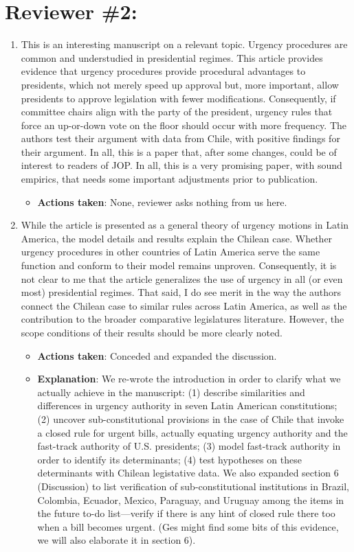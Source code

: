 \documentclass[article,letterpaper,times,12pt,listings-bw,microtype]{article}
\begin{document}
\section{Reviewer \#2:}
\label{sec:orga4b521d}
\begin{enumerate}
\item This is an interesting manuscript on a relevant topic. Urgency procedures are common and understudied in presidential regimes. This article provides evidence that urgency procedures provide procedural advantages to presidents, which not merely speed up approval but, more important, allow presidents to approve legislation with fewer modifications. Consequently, if committee chairs align with the party of the president, urgency rules that force an up-or-down vote on the floor should occur with more frequency. The authors test their argument with data from Chile, with positive findings for their argument. In all, this is a paper that, after some changes, could be of interest to readers of JOP. In all, this is a very promising paper, with sound empirics, that needs some important adjustments prior to publication.
\label{sec:org86801b7}
\begin{itemize}
\item \textbf{Actions taken}: None, reviewer asks nothing from us here.
\end{itemize}
\item While the article is presented as a general theory of urgency motions in Latin America, the model details and results explain the Chilean case. Whether urgency procedures in other countries of Latin America serve the same function and conform to their model remains unproven. Consequently, it is not clear to me that the article generalizes the use of urgency in all (or even most) presidential regimes. That said, I do see merit in the way the authors connect the Chilean case to similar rules across Latin America, as well as the contribution to the broader comparative legislatures literature. However, the scope conditions of their results should be more clearly noted.
\label{sec:org3c830b1}
\begin{itemize}
\item \textbf{Actions taken}: Conceded and expanded the discussion.
\item \textbf{Explanation}: We re-wrote the introduction in order to clarify what we actually achieve in the manuscript: (1) describe similarities and differences in urgency authority in seven Latin American constitutions; (2) uncover sub-constitutional provisions in the case of Chile that invoke a closed rule for urgent bills, actually equating urgency authority and the fast-track authority of U.S. presidents; (3) model fast-track authority in order to identify its determinants; (4) test hypotheses on these determinants with Chilean legistative data. We also expanded section 6 (Discussion) to list verification of sub-constitutional institutions in Brazil, Colombia, Ecuador, Mexico, Paraguay, and Uruguay among the items in the future to-do list---verify if there is any hint of closed rule there too when a bill becomes urgent. (Ges might find some bits of this evidence, we will also elaborate it in section 6).

\end{itemize}
\end{enumerate}
\end{document}
